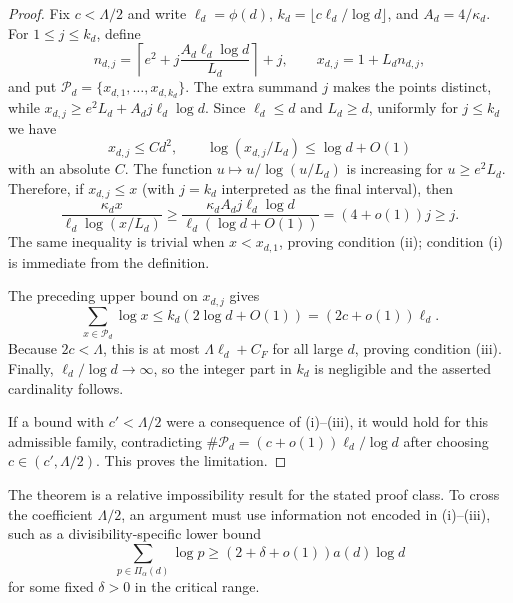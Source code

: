 \begin{proof}
Fix $c<\Lambda/2$ and write $\ell_d=\phi(d)$,
$k_d=\lfloor c\ell_d/\log d\rfloor$, and $A_d=4/\kappa_d$.
For $1\leq j\leq k_d$, define
\[
 n_{d,j}=\left\lceil e^2+j\frac{A_d\ell_d\log d}{L_d}\right\rceil+j,
 \qquad x_{d,j}=1+L_dn_{d,j},
\]
and put $\mathcal P_d=\{x_{d,1},\ldots,x_{d,k_d}\}$.  The extra summand
$j$ makes the points distinct, while $x_{d,j}\geq e^2L_d+A_d j\ell_d\log d$.
Since $\ell_d\leq d$ and $L_d\geq d$, uniformly for $j\leq k_d$ we have
\[
 x_{d,j}\leq C d^2,
 \qquad
 \log(x_{d,j}/L_d)\leq\log d+O(1)
\]
with an absolute $C$.  The function $u\mapsto u/\log(u/L_d)$ is increasing
for $u\geq e^2L_d$.  Therefore, if $x_{d,j}\leq x$ (with $j=k_d$ interpreted as the final interval), then
\[
 \frac{\kappa_d x}{\ell_d\log(x/L_d)}
 \geq
 \frac{\kappa_d A_d j\ell_d\log d}
      {\ell_d(\log d+O(1))}
 =(4+o(1))j\geq j.
\]
The same inequality is trivial when $x<x_{d,1}$, proving condition
\textup{(ii)}; condition \textup{(i)} is immediate from the definition.

The preceding upper bound on $x_{d,j}$ gives
\[
 \sum_{x\in\mathcal P_d}\log x
 \leq k_d(2\log d+O(1))
 =(2c+o(1))\ell_d.
\]
Because $2c<\Lambda$, this is at most $\Lambda\ell_d+C_F$ for all large
$d$, proving condition \textup{(iii)}.  Finally,
$\ell_d/\log d\to\infty$, so the integer part in $k_d$ is negligible and
the asserted cardinality follows.

If a bound with $c'<\Lambda/2$ were a consequence of \textup{(i)}--\textup{(iii)},
it would hold for this admissible family, contradicting
$\#\mathcal P_d=(c+o(1))\ell_d/\log d$ after choosing
$c\in(c',\Lambda/2)$.  This proves the limitation.
\end{proof}

The theorem is a relative impossibility result for the stated proof class.
To cross the coefficient $\Lambda/2$, an argument must use information not
encoded in \textup{(i)}--\textup{(iii)}, such as a divisibility-specific lower
bound
\[
 \sum_{p\in\Pi_\alpha(d)}\log p
 \geq(2+\delta+o(1))a(d)\log d
\]
for some fixed $\delta>0$ in the critical range.

